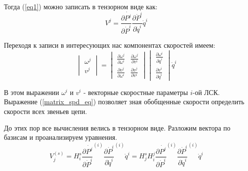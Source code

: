 \documentclass[12pt,a4paper,titlepage]{article}
\begin{document}
Тогда (\ref{eq1}) можно записать в тензорном виде как:
\begin{equation}\label{eq2}
V^j = \frac{\partial{\dot{P^j}}}{\partial{\dot{P}^i}}\frac{\partial{\dot{P}^i}}{\partial{\dot{q}^i}}\dot{q}^i 
\end{equation}

Переходя к записи в интересующих нас компонентах скоростей имеем:
\begin{equation}\label{matrix_spd_eq}
\begin{vmatrix}
\omega^j\\
v^j
\end{vmatrix}
=
\begin{vmatrix}
\frac{\partial{\omega^j}}{\partial{\omega^i}} & \frac{\partial{\omega^j}}{\partial{v^i}} \\
\frac{\partial{v^j}}{\partial{\omega^i}} & \frac{\partial{v^j}}{\partial{v^i}}
\end{vmatrix}
\begin{vmatrix}
\frac{\partial{\omega^i}}{\partial{\dot{q}^i}}\\
\frac{\partial{v^i}}{\partial{\dot{q}^i}}
\end{vmatrix}
\dot{q}^i
\end{equation}

В этом выражении $\omega^i$ и $v^i$ - векторные скоростные параметры $i$-ой ЛСК. Выражение (\ref{matrix_spd_eq}) позволяет зная обобщенные скорости определить скорости всех звеньев цепи. 

До этих пор все вычисления велись в тензорном виде. Разложим вектора по базисам и проанализируем уравнения.
\begin{equation}\label{basis_eq}
V^{(s)}_j = H^s_i\frac{\partial{\dot{P^j}}}{\partial{\dot{P}^i}}^{(i)}\frac{\partial{\dot{P}^i}}{\partial{\dot{q}^i}}^{(i)}\dot{q}^i=H^s_jH^j_i\frac{\partial{\dot{P^j}}}{\partial{\dot{P}^i}}^{(i)}\frac{\partial{\dot{P}^i}}{\partial{\dot{q}^i}}^{(i)}\dot{q}^i
\end{equation}
\end{document}
